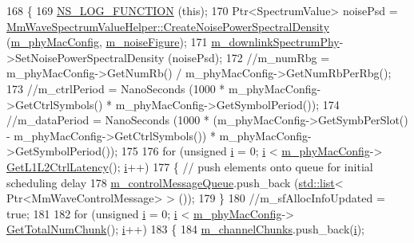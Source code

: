 \begin{DoxyCode}
168 \{
169         \hyperlink{log-macros-disabled_8h_a90b90d5bad1f39cb1b64923ea94c0761}{NS\_LOG\_FUNCTION} (\textcolor{keyword}{this});
170         Ptr<SpectrumValue> noisePsd = 
      \hyperlink{classns3_1_1MmWaveSpectrumValueHelper_ae17f7f89a0ce6934b94886b463c6db44}{MmWaveSpectrumValueHelper::CreateNoisePowerSpectralDensity}
       (\hyperlink{classns3_1_1MmWavePhy_a869abf36bbdbb94eed77ba6e4846f6e4}{m\_phyMacConfig}, \hyperlink{classns3_1_1MmWavePhy_ac3010f7611906c8dc5e93bc13ff79819}{m\_noiseFigure});
171         \hyperlink{classns3_1_1MmWavePhy_aa266d9d20ba903f9adf2695dd626b885}{m\_downlinkSpectrumPhy}->SetNoisePowerSpectralDensity (noisePsd);
172   \textcolor{comment}{//m\_numRbg = m\_phyMacConfig->GetNumRb() / m\_phyMacConfig->GetNumRbPerRbg();}
173         \textcolor{comment}{//m\_ctrlPeriod = NanoSeconds (1000 * m\_phyMacConfig->GetCtrlSymbols() *
       m\_phyMacConfig->GetSymbolPeriod());}
174         \textcolor{comment}{//m\_dataPeriod = NanoSeconds (1000 * (m\_phyMacConfig->GetSymbPerSlot() -
       m\_phyMacConfig->GetCtrlSymbols()) * m\_phyMacConfig->GetSymbolPeriod());}
175 
176         \textcolor{keywordflow}{for} (\textcolor{keywordtype}{unsigned} \hyperlink{bernuolliDistribution_8m_a6f6ccfcf58b31cb6412107d9d5281426}{i} = 0; \hyperlink{bernuolliDistribution_8m_a6f6ccfcf58b31cb6412107d9d5281426}{i} < \hyperlink{classns3_1_1MmWavePhy_a869abf36bbdbb94eed77ba6e4846f6e4}{m\_phyMacConfig}->
      \hyperlink{classns3_1_1MmWavePhyMacCommon_a15d8a9077e0cc01988071eb3abe1f3de}{GetL1L2CtrlLatency}(); \hyperlink{bernuolliDistribution_8m_a6f6ccfcf58b31cb6412107d9d5281426}{i}++)
177         \{ \textcolor{comment}{// push elements onto queue for initial scheduling delay}
178                 \hyperlink{classns3_1_1MmWavePhy_ab8d262ef427a0c22ebb614f9991e7ce0}{m\_controlMessageQueue}.push\_back (\hyperlink{openflow-interface_8h_afd9bcfa176617760671b67580f536fa7}{std::list}<
      Ptr<MmWaveControlMessage> > ());
179         \}
180         \textcolor{comment}{//m\_sfAllocInfoUpdated = true;}
181 
182         \textcolor{keywordflow}{for} (\textcolor{keywordtype}{unsigned} \hyperlink{bernuolliDistribution_8m_a6f6ccfcf58b31cb6412107d9d5281426}{i} = 0; \hyperlink{bernuolliDistribution_8m_a6f6ccfcf58b31cb6412107d9d5281426}{i} < \hyperlink{classns3_1_1MmWavePhy_a869abf36bbdbb94eed77ba6e4846f6e4}{m\_phyMacConfig}->
      \hyperlink{classns3_1_1MmWavePhyMacCommon_a97e82c809a351fea9d5058ac1bb4c3c6}{GetTotalNumChunk}(); \hyperlink{bernuolliDistribution_8m_a6f6ccfcf58b31cb6412107d9d5281426}{i}++)
183         \{
184                 \hyperlink{classns3_1_1MmWaveEnbPhy_a0aa065c471eb33a7bf9ba6acb966b8ff}{m\_channelChunks}.push\_back(\hyperlink{bernuolliDistribution_8m_a6f6ccfcf58b31cb6412107d9d5281426}{i});

\end{DoxyCode}
